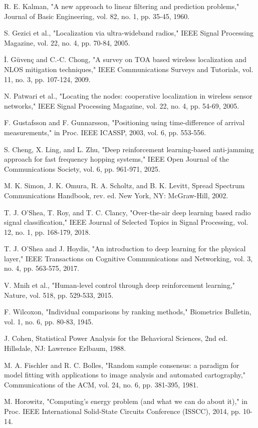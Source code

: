  R. E. Kalman, "A new approach to linear filtering and prediction problems," Journal of Basic Engineering, vol. 82, no. 1, pp. 35-45, 1960.

 S. Gezici et al., "Localization via ultra-wideband radios," IEEE Signal Processing Magazine, vol. 22, no. 4, pp. 70-84, 2005.

 \.{I}. Güvenç and C.-C. Chong, "A survey on TOA based wireless localization and NLOS mitigation techniques," IEEE Communications Surveys and Tutorials, vol. 11, no. 3, pp. 107-124, 2009.

 N. Patwari et al., "Locating the nodes: cooperative localization in wireless sensor networks," IEEE Signal Processing Magazine, vol. 22, no. 4, pp. 54-69, 2005.

 F. Gustafsson and F. Gunnarsson, "Positioning using time-difference of arrival measurements," in Proc. IEEE ICASSP, 2003, vol. 6, pp. 553-556.

 S. Cheng, X. Ling, and L. Zhu, "Deep reinforcement learning-based anti-jamming approach for fast frequency hopping systems," IEEE Open Journal of the Communications Society, vol. 6, pp. 961-971, 2025.

 M. K. Simon, J. K. Omura, R. A. Scholtz, and B. K. Levitt, Spread Spectrum Communications Handbook, rev. ed. New York, NY: McGraw-Hill, 2002.

 T. J. O'Shea, T. Roy, and T. C. Clancy, "Over-the-air deep learning based radio signal classification," IEEE Journal of Selected Topics in Signal Processing, vol. 12, no. 1, pp. 168-179, 2018.

 T. J. O'Shea and J. Hoydis, "An introduction to deep learning for the physical layer," IEEE Transactions on Cognitive Communications and Networking, vol. 3, no. 4, pp. 563-575, 2017.

 V. Mnih et al., "Human-level control through deep reinforcement learning," Nature, vol. 518, pp. 529-533, 2015.

 F. Wilcoxon, "Individual comparisons by ranking methods," Biometrics Bulletin, vol. 1, no. 6, pp. 80-83, 1945.

 J. Cohen, Statistical Power Analysis for the Behavioral Sciences, 2nd ed. Hillsdale, NJ: Lawrence Erlbaum, 1988.

 M. A. Fischler and R. C. Bolles, "Random sample consensus: a paradigm for model fitting with applications to image analysis and automated cartography," Communications of the ACM, vol. 24, no. 6, pp. 381-395, 1981.

 M. Horowitz, "Computing's energy problem (and what we can do about it)," in Proc. IEEE International Solid-State Circuits Conference (ISSCC), 2014, pp. 10-14.
